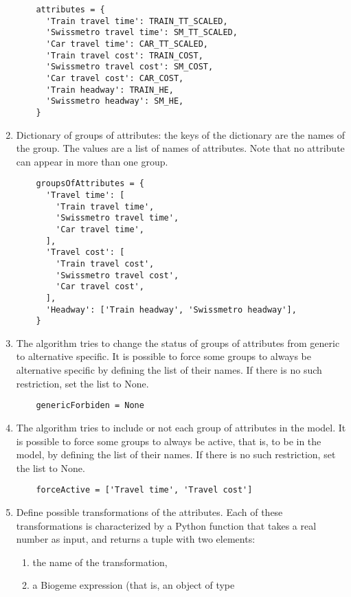 \documentclass[12pt,a4paper]{article}
\begin{document}
\begin{enumerate}
  \begin{lstlisting}
    attributes = {
      'Train travel time': TRAIN_TT_SCALED,
      'Swissmetro travel time': SM_TT_SCALED,
      'Car travel time': CAR_TT_SCALED,
      'Train travel cost': TRAIN_COST,
      'Swissmetro travel cost': SM_COST,
      'Car travel cost': CAR_COST,
      'Train headway': TRAIN_HE,
      'Swissmetro headway': SM_HE,
    }
  \end{lstlisting}
\item \label{item:groups} Dictionary of groups of attributes: the keys of the dictionary
  are the names of the group. The values are a list of names of
  attributes. Note that no attribute can appear in more than one
  group.
  \begin{lstlisting}
    groupsOfAttributes = {
      'Travel time': [
        'Train travel time',
        'Swissmetro travel time',
        'Car travel time',
      ],
      'Travel cost': [
        'Train travel cost',
        'Swissmetro travel cost',
        'Car travel cost',
      ],
      'Headway': ['Train headway', 'Swissmetro headway'],
    }
  \end{lstlisting}
\item \label{item:generic} The algorithm tries to change the status of groups of
  attributes from generic to alternative specific. It is possible to
  force some groups to always be alternative specific by defining
  the list of their names. If there is no such restriction, set the
  list to None.
  \begin{lstlisting}
    genericForbiden = None
  \end{lstlisting}
\item \label{item:active}The algorithm tries to include or not each group of
  attributes in the model. It is possible to force some groups to
  always be active, that is, to be in the model, by defining the list
  of their names. If there is no such restriction, set the
  list to None. 
  \begin{lstlisting}
    forceActive = ['Travel time', 'Travel cost']
  \end{lstlisting}
\item \label{item:transform}Define possible transformations of the attributes. Each of these
  transformations is characterized by a Python function that takes a
  real number as input, and returns a tuple with two elements:
  \begin{enumerate}
  \item the name of the transformation,
  \item a Biogeme expression (that is, an object of type


\end{enumerate}
\end{enumerate}
\end{document}
